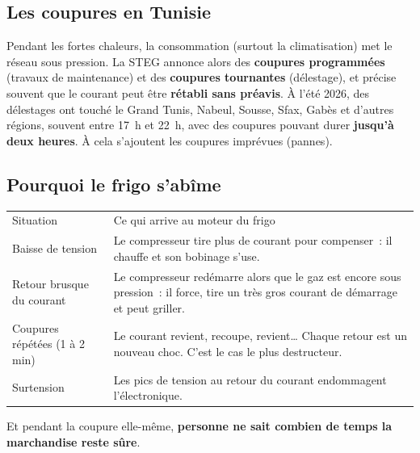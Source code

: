 \documentclass[10pt,a4paper]{article}
\begin{document}
\subsection{Les coupures en Tunisie}
Pendant les fortes chaleurs, la consommation (surtout la climatisation) met le réseau sous pression. La STEG annonce alors des \textbf{coupures programmées} (travaux de maintenance) et des \textbf{coupures tournantes} (délestage), et précise souvent que le courant peut être \textbf{rétabli sans préavis}. À l'été 2026, des délestages ont touché le Grand Tunis, Nabeul, Sousse, Sfax, Gabès et d'autres régions, souvent entre 17~h et 22~h, avec des coupures pouvant durer \textbf{jusqu'à deux heures}. À cela s'ajoutent les coupures imprévues (pannes).

\subsection{Pourquoi le frigo s'abîme}
\begin{tabularx}{\linewidth}{Q{3.6cm}L}
 Situation & \mdseries Ce qui arrive au moteur du frigo \\
Baisse de tension & Le compresseur tire plus de courant pour compenser~: il chauffe et son bobinage s'use. \\
Retour brusque du courant & Le compresseur redémarre alors que le gaz est encore sous pression~: il force, tire un très gros courant de démarrage et peut griller. \\
Coupures répétées (1 à 2 min) & Le courant revient, recoupe, revient\ldots{} Chaque retour est un nouveau choc. C'est le cas le plus destructeur. \\
Surtension & Les pics de tension au retour du courant endommagent l'électronique. \\
\end{tabularx}

Et pendant la coupure elle-même, \textbf{personne ne sait combien de temps la marchandise reste sûre}.
\end{document}
